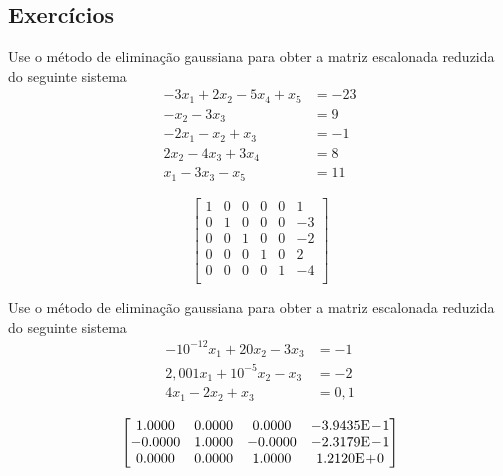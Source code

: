 \subsection*{Exercícios}

\begin{exer}\label{exer:egauss_reduzida}
  Use o método de eliminação gaussiana para obter a matriz escalonada reduzida do seguinte sistema
  \begin{align}
    -3x_1 + 2x_2 -5x_4 + x_5 &= -23\\
    -x_2 -3x_3 &= 9\\
    -2x_1 -x_2 + x_3 &= -1\\
    2x_2 - 4x_3 + 3x_4 &= 8\\
    x_1 - 3x_3 - x_5 &= 11
  \end{align}
\end{exer}
\begin{resp}
  $$
  \begin{bmatrix}
    1 & 0 & 0 & 0 & 0 & 1\\
    0 & 1 & 0 & 0 & 0 & -3\\
    0 & 0 & 1 & 0 & 0 & -2\\
    0 & 0 & 0 & 1 & 0 & 2\\
    0 & 0 & 0 & 0 & 1 & -4\\
  \end{bmatrix}
  $$
\end{resp}

\begin{exer}\label{exer:egauss_arredondamento}
  Use o método de eliminação gaussiana para obter a matriz escalonada reduzida do seguinte sistema
  \begin{align}
    -10^{-12}x_1 + 20x_2 - 3x_3 &= -1\\
    2,001x_1 + 10^{-5}x_2 - x_3 &= -2\\
    4x_1 - 2x_2 + x_3 &= 0,1
  \end{align}
\end{exer}
\begin{resp}
  $$
  \begin{bmatrix}
   1.0000 &  0.0000 &  0.0000 & -3.9435\mathrm{E}\!-\!1\\
  -0.0000 &  1.0000 & -0.0000 & -2.3179\mathrm{E}\!-\!1\\
   0.0000 &  0.0000 &  1.0000 &  1.2120\mathrm{E}\!+\!0
  \end{bmatrix}
  $$
\end{resp}

